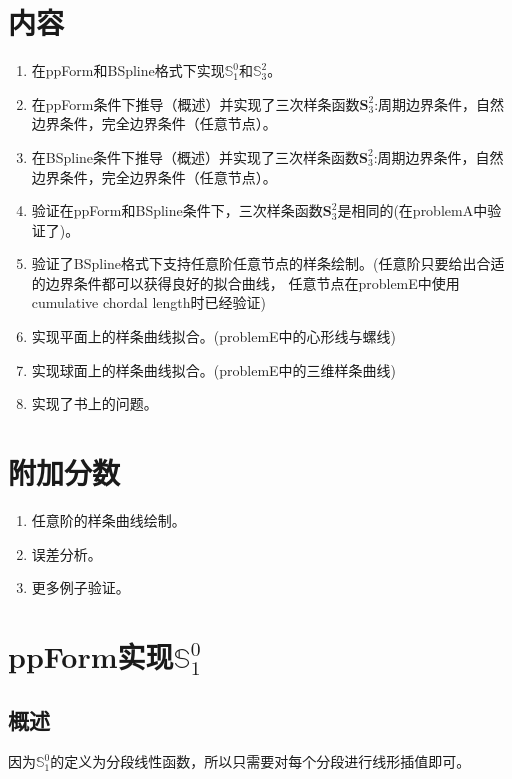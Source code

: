 \documentclass[UTF8]{ctexart}
\begin{document}
\pagestyle{fancy}
\fancyhead{}

\section*{内容}
\begin{enumerate}
    \item 在ppForm和BSpline格式下实现$\mathbb{S}_{1}^{0} $和$\mathbb{S}_{3}^{2} $。
    \item 在ppForm条件下推导（概述）并实现了三次样条函数$\mathbf{S}_{3}^{2}$:周期边界条件，自然边界条件，完全边界条件（任意节点）。
    \item 在BSpline条件下推导（概述）并实现了三次样条函数$\mathbf{S}_{3}^{2}$:周期边界条件，自然边界条件，完全边界条件（任意节点）。
    \item 验证在ppForm和BSpline条件下，三次样条函数$\mathbf{S}_{3}^{2}$是相同的(在problemA中验证了)。
    \item 验证了BSpline格式下支持任意阶任意节点的样条绘制。(任意阶只要给出合适的边界条件都可以获得良好的拟合曲线，
          任意节点在problemE中使用cumulative chordal length时已经验证)
    \item 实现平面上的样条曲线拟合。(problemE中的心形线与螺线)
    \item 实现球面上的样条曲线拟合。(problemE中的三维样条曲线)
    \item 实现了书上的问题。
\end{enumerate}

\section*{附加分数}
\begin{enumerate}
    \item 任意阶的样条曲线绘制。
    \item 误差分析。
    \item 更多例子验证。
\end{enumerate}

\section*{ppForm实现$\mathbb{S}_{1}^{0} $}
\subsection*{概述}
    因为$\mathbb{S}_{1}^{0} $的定义为分段线性函数，所以只需要对每个分段进行线形插值即可。
\end{document}
